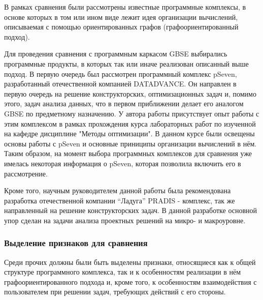\def\notedate{2022.02.09}
\def\currentauthor{Тришин И.В. (РК6)}%

В рамках сравнения были рассмотрены известные программные комплексы, в основе которых в том или ином виде лежит идея организации вычислений, описываемая с помощью ориентированных графов (графоориентированный подход).

Для проведения сравнения с программным каркасом GBSE выбирались программные продукты, в которых так или иначе реализован описанный выше подход. В первую очередь был рассмотрен программный комплекс pSeven, разработанный отечественной компанией DATADVANCE. Он направлен в первую очередь на решение конструкторских, оптимизационных задач и, помимо этого, задач анализа данных, что в первом приближении делает его аналогом GBSE по предметному назначению. У автора работы присутствует опыт работы с этим комплексом в рамках прохождения курса лабораторных работ по изученной на кафедре дисциплине "Методы оптимизации". В данном курсе были освещены основы работы с pSeven и основные приниципы организации вычислений в нём. Таким образом, на момент выбора программных комплексов для сравнения уже имелась некоторая информация о pSeven, которая позволила включить его в рассмотрение.

Кроме того, научным руководителем данной работы была рекомендована разработка отечественной компании ``Ладуга'' PRADIS - комплекс, так же направленный на решение конструкторских задач. В данной разработке основной упор сделан на задачи анализа проектных решений на микро- и макроуровне.

\subsubsection{Выделение признаков для сравнения}


Среди прочих должны были быть выделены признаки, относящиеся как к общей структуре программного комплекса, так и к особенностям реализации в нём графоориентированного подхода и, кроме того, к особенностям взаимодействия с пользователем при решении задач, требующих действий с его стороны.

